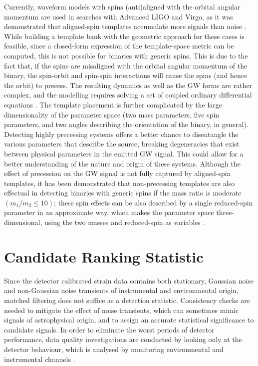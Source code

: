 \documentclass[binding=0.6cm, LaM]{sapthesis}
\begin{document}
	Currently, waveform models with spins (anti)aligned with the orbital angular momentum 
	are used in searches with Advanced LIGO and Virgo, 
	as it was demonstrated that aligned-spin templates accumulate more signals than noise \cite{27}. 
	While building a template bank with the geometric approach for these cases is feasible, 
	since a closed-form expression of the template-space metric can be computed, 
	this is not possible for binaries with generic spins. 
	This is due to the fact that, 
	if the spins are misaligned with the orbital angular momentum of the binary, 
	the spin-orbit and spin-spin interactions will cause the spins 
	(and hence the orbit) to precess. 
	The resulting dynamics as well as the GW forms are rather complex, 
	and the modelling requires solving a set of coupled ordinary differential equations \cite{39}. 
	The template placement is further complicated by the large dimensionality of the parameter space 
	(two mass parameters, five spin parameters, and two angles describing the orientation of the binary, in general). 
	Detecting highly precessing systems offers a better chance to 
	disentangle the various parameters that describe the source,
	breaking degeneracies that exist between physical parameters 
	in the emitted GW signal.
	This could allow for a better understanding of the nature and origin of these systems.
	Although the effect of precession on the GW signal is not fully captured 
	by aligned-spin templates, it has been demonstrated that non-precessing templates 
	are also effectual in detecting binaries with generic spins if the mass ratio is moderate 
	$(m_1/m_2 \leq 10)$; these spin effects can be also described by 
	a single reduced-spin parameter in an approximate way, 
	which makes the parameter space three-dimensional, 
	using the two masses and reduced-spin as variables \cite{32}. 
	
\section{Candidate Ranking Statistic}
\label{sec:ranking}
 	Since the detector calibrated strain data contains both stationary, Gaussian noise
        and non-Gaussian noise transients of instrumental and environmental origin,
        matched filtering does not suffice as a detection statistic.
        Consistency checks are needed to mitigate the effect of noise transients,
        which can sometimes mimic signals of astrophysical origin,
        and to assign an accurate statistical significance to candidate signals.
        In order to eliminate the worst periods of detector performance, 
        data quality investigations are conducted by looking only at the detector behaviour,
        which is analysed by monitoring environmental and instrumental channels \cite{40}.
\end{document}
